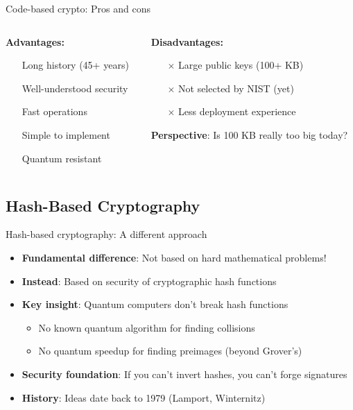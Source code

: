 \documentclass[aspectratio=169, lualatex, handout]{beamer}
\begin{document}
\begin{frame}{Code-based crypto: Pros and cons}
	\begin{columns}[c]
		\begin{column}{0.5\textwidth}
			\textbf{Advantages:}
			\begin{itemize}
				\item[\mycheckmark] Long history (45+ years)
				\item[\mycheckmark] Well-understood security
				\item[\mycheckmark] Fast operations
				\item[\mycheckmark] Simple to implement
				\item[\mycheckmark] Quantum resistant
			\end{itemize}
		\end{column}
		\begin{column}{0.5\textwidth}
			\textbf{Disadvantages:}
			\begin{itemize}
				\item[$\times$] Large public keys (100+ KB)
				\item[$\times$] Not selected by NIST (yet)
				\item[$\times$] Less deployment experience
			\end{itemize}

			\vspace{5mm}
			\textbf{Perspective}: Is 100 KB really too big today?
		\end{column}
	\end{columns}
\end{frame}

\subsection{Hash-Based Cryptography}

\begin{frame}{Hash-based cryptography: A different approach}
	\begin{itemize}
		\item \textbf{Fundamental difference}: Not based on hard mathematical problems!
		\item \textbf{Instead}: Based on security of cryptographic hash functions
		\item \textbf{Key insight}: Quantum computers don't break hash functions
		      \begin{itemize}
			      \item No known quantum algorithm for finding collisions
			      \item No quantum speedup for finding preimages (beyond Grover's)
		      \end{itemize}
		\item \textbf{Security foundation}: If you can't invert hashes, you can't forge signatures
		\item \textbf{History}: Ideas date back to 1979 (Lamport, Winternitz)
	\end{itemize}
\end{frame}
\end{document}
